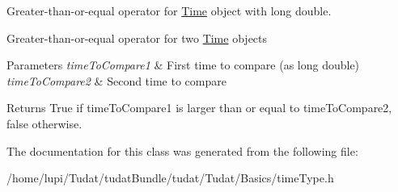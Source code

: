 Greater-\/than-\/or-\/equal operator for \hyperlink{classtudat_1_1Time}{Time} object with long double. 

Greater-\/than-\/or-\/equal operator for two \hyperlink{classtudat_1_1Time}{Time} objects 
\begin{DoxyParams}{Parameters}
{\em time\+To\+Compare1} & First time to compare (as long double) \\
\hline
{\em time\+To\+Compare2} & Second time to compare \\
\hline
\end{DoxyParams}
\begin{DoxyReturn}{Returns}
True if time\+To\+Compare1 is larger than or equal to time\+To\+Compare2, false otherwise. 
\end{DoxyReturn}


The documentation for this class was generated from the following file\+:\begin{DoxyCompactItemize}
\item 
/home/lupi/\+Tudat/tudat\+Bundle/tudat/\+Tudat/\+Basics/time\+Type.\+h\end{DoxyCompactItemize}
